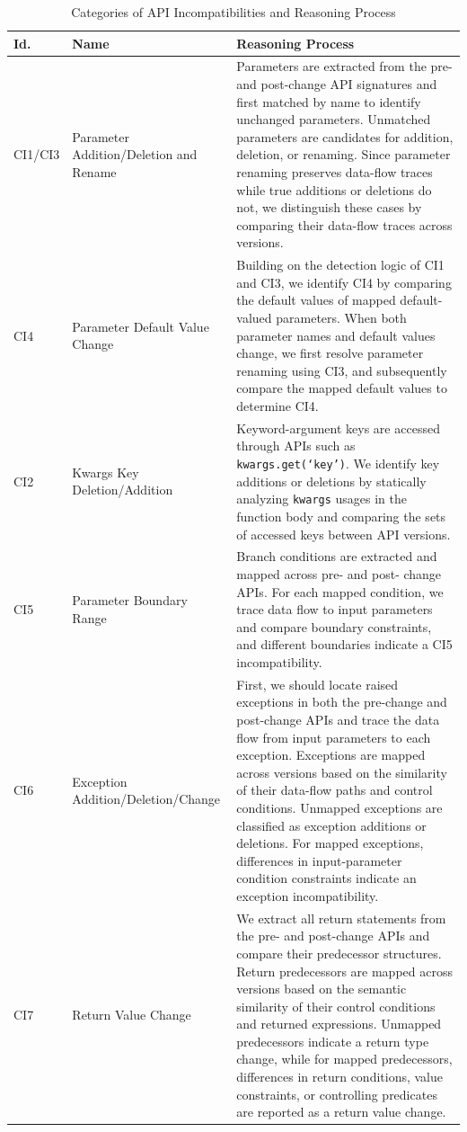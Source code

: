 \begin{table}[!t]
\centering
\small
\caption{Categories of API Incompatibilities and Reasoning Process}\label{tab:ci-catalog}
  \begin{tabular}{p{0.5cm} p{2.0cm} p{14.0cm}}
    \toprule
    Id. & Name & Reasoning Process \\
    \midrule
    CI1/CI3 & Parameter Addition/Deletion and Rename  & 
    Parameters are extracted from the pre- and post-change API signatures and first matched by name to identify unchanged parameters. Unmatched parameters are candidates for addition, deletion, or renaming. Since parameter renaming preserves data-flow traces while true additions or deletions do not, we distinguish these cases by comparing their data-flow traces across versions.
    \\
    \hline
    CI4 & Parameter Default Value Change
    & 
    Building on the detection logic of CI1 and CI3, we identify CI4 by comparing the default values of mapped default-valued parameters. When both parameter names and default values change, we first resolve parameter renaming using CI3, and subsequently compare the mapped default values to determine CI4.
    \\
    \hline
    CI2 & Kwargs Key Deletion/Addition
    &  
    Keyword-argument keys are accessed through APIs such as \texttt{kwargs.get(`key')}. We identify key additions or deletions by statically analyzing \texttt{kwargs} usages in the function body and comparing the sets of accessed keys between API versions.
    \\
    \hline
    CI5 & Parameter Boundary Range 
    & 
    Branch conditions are extracted and mapped across pre- and post- change APIs. For each mapped condition, we trace data flow to input parameters and compare boundary constraints, and different boundaries indicate a CI5 incompatibility.
    \\
    \hline
    CI6 & Exception Addition/Deletion/Change & 
    First, we should locate raised exceptions in both the pre-change and post-change APIs and trace the data flow from input parameters to each exception. Exceptions are mapped across versions based on the similarity of their data-flow paths and control conditions. Unmapped exceptions are classified as exception additions or deletions. For mapped exceptions, differences in input-parameter condition constraints indicate an exception incompatibility.
    \\\hline
    CI7 & Return Value Change
    & 
    We extract all return statements from the pre- and post-change APIs and compare their predecessor structures. Return predecessors are mapped across versions based on the semantic similarity of their control conditions and returned expressions. Unmapped predecessors indicate a return type change, while for mapped predecessors, differences in return conditions, value constraints, or controlling predicates are reported as a return value change.

\end{tabular}
\end{table}
